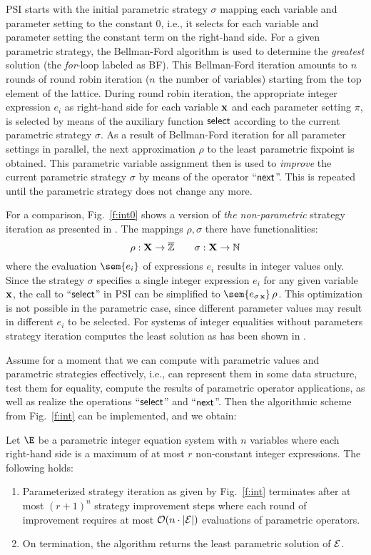 \documentclass[a4paper]{easychair}
\newcommand{\NN}{\mathbb{N}}
\newcommand{\ZzZ}{\overline{\mathbb Z}}
\begin{document}
PSI starts with the initial parametric strategy $\sigma$ mapping each variable and 
parameter setting to the constant $0$,
i.e., it selects for each variable and parameter setting the constant term on the right-hand side.
For a given parametric strategy, the Bellman-Ford algorithm is used to determine the \emph{greatest} solution
(the \emph{for}-loop labeled as BF). This Bellman-Ford iteration amounts to $n$ rounds of round robin iteration 
($n$ the number of variables) starting from the top element of the lattice.
During round robin iteration, the appropriate integer expression $e_i$ as right-hand side for each variable ${\bf x}$ 
and each parameter setting $\pi$, is selected by means of the auxiliary function ${\sf select}$ according to
the current parametric strategy $\sigma$.
As a result of Bellman-Ford iteration for all parameter settings in parallel, 
the next approximation $\rho$ to the least parametric fixpoint is obtained.
This parametric variable assignment then is used to \emph{improve} the current parametric strategy $\sigma$
by means of the operator ``${\sf next}$''. This is repeated until the parametric strategy does not change any more.

For a comparison, Fig.\ \ref{f:int0} shows a version of \emph{the non-parametric} strategy iteration as presented in
\cite{DBLP:conf/fm/GawlitzaS08}.
The mappings $\rho,\sigma$ there have functionalities:
\[
\rho: {\bf X}\to\ZzZ\qquad\sigma:{\bf X}\to\NN
\]
where the evaluation $\sem{e_i}$ of expressions $e_i$ results in integer values only.
Since the strategy $\sigma$ specifies a single integer expression $e_i$ for any given
variable $\bf x$, the call to ``${\sf select}$'' in PSI can be simplified to $\sem{e_{\sigma\,{\bf x}}}\,\rho$.
This optimization is not possible in the parametric case, since different parameter values
may result in different $e_i$ to be selected. 
For systems of integer equalities without parameters
strategy iteration computes the least solution as has been shown in \cite{DBLP:conf/fm/GawlitzaS08}.

Assume for a moment that we can compute with parametric values and parametric strategies effectively,
i.e., can represent them in some data structure, test them for equality,
compute the results of parametric operator applications, as well as realize the operations ``${\sf select}$'' and
``${\sf next}$''. Then the algorithmic scheme from Fig.~\ref{f:int} can be implemented, and we obtain:

\begin{theorem}
Let $\E$ be a parametric integer equation system with $n$ variables
where each right-hand side is a maximum of at most $r$ non-constant integer expressions.
The following holds:
\begin{enumerate}
\item
Parameterized strategy iteration as given by Fig.\ \ref{f:int} terminates after 
at most $(r+1)^n$ strategy improvement steps where each round of improvement requires at most 
${\cal O}(n\cdot|{\cal E}|)$ evaluations of parametric operators.
\item
On termination, the algorithm returns the least parametric solution of $\cal E$.
\end{enumerate}
\end{theorem}
\end{document}
